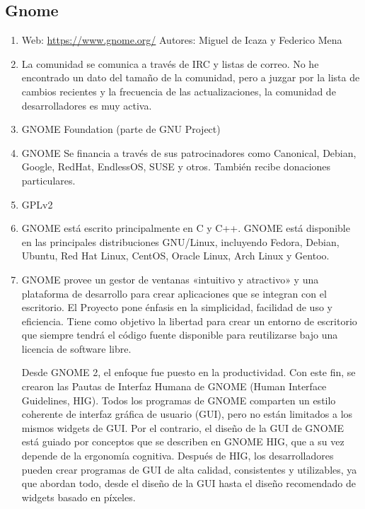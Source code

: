 \subsection{Gnome}
\begin{enumerate}
    \item Web: \url{https://www.gnome.org/} Autores:  Miguel de Icaza y Federico Mena 
    \item La comunidad se comunica a través de IRC y listas de correo. No he encontrado un dato del tamaño de la comunidad, pero a juzgar por la lista de cambios recientes y la frecuencia de las actualizaciones, la comunidad de desarrolladores es muy activa.
    \item GNOME Foundation (parte de GNU Project)
    \item GNOME Se financia a través de sus patrocinadores como Canonical, Debian, Google, RedHat, EndlessOS, SUSE y otros. También recibe donaciones particulares.
    \item GPLv2
    \item GNOME está escrito principalmente en C y C++. GNOME está disponible en las principales distribuciones GNU/Linux, incluyendo Fedora, Debian, Ubuntu, Red Hat Linux, CentOS, Oracle Linux, Arch Linux y Gentoo.
    \item GNOME provee un gestor de ventanas «intuitivo y atractivo» y una plataforma de desarrollo para crear aplicaciones que se integran con el escritorio. El Proyecto pone énfasis en la simplicidad, facilidad de uso y eficiencia. Tiene como objetivo la libertad para crear un entorno de escritorio que siempre tendrá el código fuente disponible para reutilizarse bajo una licencia de software libre.
    
    Desde GNOME 2, el enfoque fue puesto en la productividad. Con este fin, se crearon las Pautas de Interfaz Humana de GNOME (Human Interface Guidelines, HIG). Todos los programas de GNOME comparten un estilo coherente de interfaz gráfica de usuario (GUI), pero no están limitados a los mismos widgets de GUI. Por el contrario, el diseño de la GUI de GNOME está guiado por conceptos que se describen en GNOME HIG, que a su vez depende de la ergonomía cognitiva. Después de HIG, los desarrolladores pueden crear programas de GUI de alta calidad, consistentes y utilizables, ya que abordan todo, desde el diseño de la GUI hasta el diseño recomendado de widgets basado en píxeles.
\end{enumerate}


